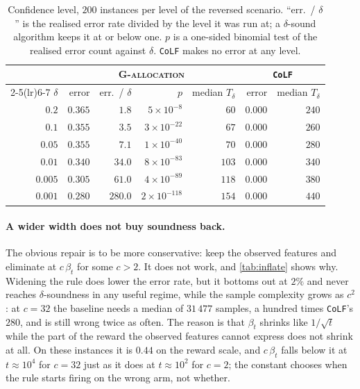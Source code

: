 \begin{table}[t]
  \centering
  \caption{Confidence level, $200$ instances per level of the reversed
  scenario.  ``err.\ / $\delta$'' is the realised error rate divided by the
  level it was run at; a $\delta$-sound algorithm keeps it at or below one.
  $p$ is a one-sided binomial test of the realised error count against
  $\delta$.  \texttt{CoLF} makes no error at any level.}
  \label{tab:delta}
  \small
  \begin{tabular}{rrrrrrr}
    \toprule
    & \multicolumn{4}{c}{\textsc{G-allocation}} & \multicolumn{2}{c}{\texttt{CoLF}}\\
    \cmidrule(lr){2-5}\cmidrule(lr){6-7}
    $\delta$ & error & err.\ / $\delta$ & $p$ & median $T_\delta$
             & error & median $T_\delta$\\
    \midrule
    $0.2$   & $0.365$ & $1.8$   & $5\!\times\!10^{-8}$   & $60$  & $0.000$ & $240$\\
    $0.1$   & $0.355$ & $3.5$   & $3\!\times\!10^{-22}$  & $67$  & $0.000$ & $260$\\
    $0.05$  & $0.355$ & $7.1$   & $1\!\times\!10^{-40}$  & $70$  & $0.000$ & $280$\\
    $0.01$  & $0.340$ & $34.0$  & $8\!\times\!10^{-83}$  & $103$ & $0.000$ & $340$\\
    $0.005$ & $0.305$ & $61.0$  & $4\!\times\!10^{-89}$  & $118$ & $0.000$ & $380$\\
    $0.001$ & $0.280$ & $280.0$ & $2\!\times\!10^{-118}$ & $154$ & $0.000$ & $440$\\
    \bottomrule
  \end{tabular}
\end{table}

\paragraph{A wider width does not buy soundness back.}
The obvious repair is to be more conservative: keep the observed features and
eliminate at $c\,\beta_t$ for some $c>2$.  It does not work, and
\cref{tab:inflate} shows why.  Widening the rule does lower the error rate, but
it bottoms out at $2\%$ and never reaches $\delta$-soundness in any useful
regime, while the sample complexity grows as $c^2$: at $c=32$ the baseline
needs a median of $31\,477$ samples, a hundred times \texttt{CoLF}'s $280$, and
is still wrong twice as often.  The reason is that $\beta_t$ shrinks like
$1/\sqrt t$ while the part of the reward the observed features cannot express
does not shrink at all.  On these instances it is $0.44$ on the reward scale,
and $c\,\beta_t$ falls below it at $t\approx 10^4$ for $c=32$ just as it does at
$t\approx 10^2$ for $c=2$; the constant chooses when the rule starts firing on
the wrong arm, not whether.

